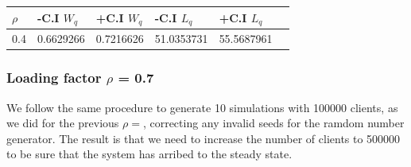 \documentclass[]{article}
\begin{document}
\begin{longtable}[]{@{}llllll@{}}
\toprule
\(\rho\) & -C.I \(W_{q}\) & +C.I \(W_{q}\) & -C.I \(L_{q}\) & +C.I
\(L_{q}\) &\tabularnewline
\midrule
\endhead
0.4 & 0.6629266 & 0.7216626 & 51.0353731 & 55.5687961\tabularnewline
\bottomrule
\end{longtable}

\subsubsection{\texorpdfstring{Loading factor \(\rho\) =
0.7}{Loading factor \textbackslash{}rho = 0.7}}\label{loading-factor-rho-0.7}

We follow the same procedure to generate 10 simulations with 100000
clients, as we did for the previous \(\rho=\), correcting any invalid
seeds for the ramdom number generator. The result is that we need to
increase the number of clients to 500000 to be sure that the system has
arribed to the steady state.
\end{document}
